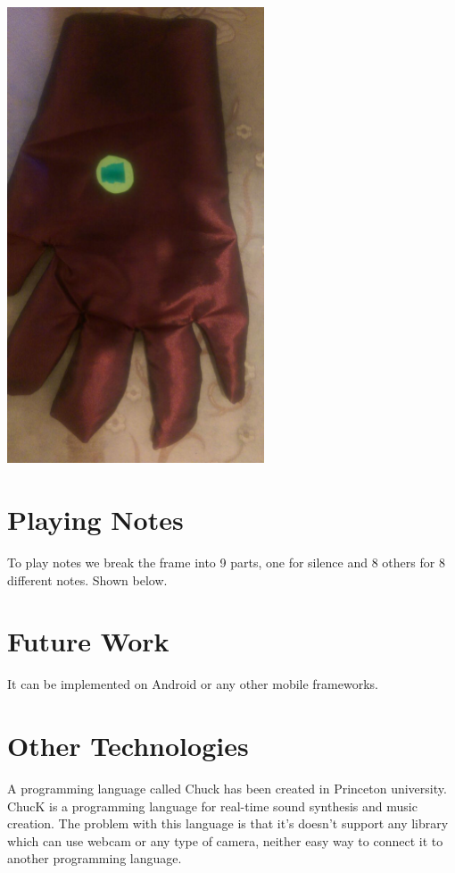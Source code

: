 \documentclass{report}
\begin{document}
\begin{center}
	\includegraphics[width=3in]{Object8.jpg}
\end{center}

\section{Playing Notes}
To play notes we break the frame into 9 parts, one for silence and 8 others for 8 different notes. Shown below.


\section{Future Work}
It can be implemented on Android or any other mobile frameworks.
\section{Other Technologies}
A programming language called Chuck has been created in Princeton university. ChucK is a programming language for real-time sound synthesis and music creation. The problem with this language is that it's doesn't support any library which can use webcam or any type of camera, neither easy way to connect it to another programming language.
\end{document}
